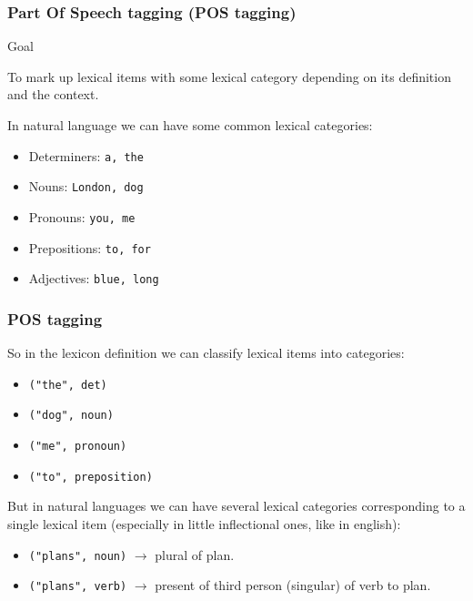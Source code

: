 \documentclass[11pt]{beamer}
\begin{document}
\begin{frame}
\frametitle{Part Of Speech tagging (POS tagging)}
	\begin{block}{Goal}
		\begin{center}
			To mark up lexical items with some lexical category depending on its definition and the context.
		\end{center}
	\end{block}
	\vspace{15pt}
	\pause
	In natural language we can have some common lexical categories:
	\begin{itemize}
		\item Determiners: \texttt{a, the} 
		\item Nouns: \texttt{London, dog} 
		\item Pronouns: \texttt{you, me} 
		\item Prepositions: \texttt{to, for} 
		\item Adjectives: \texttt{blue, long} 
	\end{itemize}
\end{frame}

\begin{frame}
\frametitle{POS tagging}
So in the lexicon definition we can classify lexical items into categories:\par
\begin{itemize}
	\item \texttt{("the", det)}
	\item \texttt{("dog", noun)}
	\item \texttt{("me", pronoun)}
	\item \texttt{("to", preposition)}
\end{itemize}
\vspace{5pt}
\pause
But in natural languages we can have several lexical categories corresponding to a single lexical item (especially in little inflectional ones, like in english): 
\begin{itemize}
	\item \texttt{("plans", noun)} $\longrightarrow$ plural of plan.
	\item \texttt{("plans", verb)} $\longrightarrow$ present of third person (singular) of verb to plan.
\end{itemize}
\end{frame}
\end{document}
